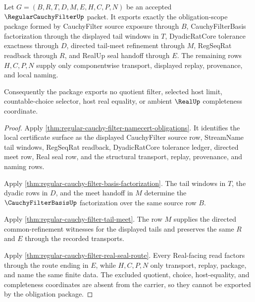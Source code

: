 \begin{theorem}
\label{thm:regular-cauchy-filter-obligation-scope-package}
Let $G=(B,R,T,D,M,E,H,C,P,N)$ be an accepted $\RegularCauchyFilterUp$ packet. It exports exactly the obligation-scope package formed by CauchyFilter source exposure through $B$, CauchyFilterBasis factorization through the displayed tail windows in $T$, DyadicRatCore tolerance exactness through $D$, directed tail-meet refinement through $M$, RegSeqRat readback through $R$, and RealUp seal handoff through $E$. The remaining rows $H,C,P,N$ supply only componentwise transport, displayed replay, provenance, and local naming.

Consequently the package exports no quotient filter, selected host limit, countable-choice selector, host real equality, or ambient $\RealUp$ completeness coordinate.
\end{theorem}
\begin{proof}
Apply \autoref{thm:regular-cauchy-filter-namecert-obligations}. It identifies the local certificate surface as the displayed CauchyFilter source row, StreamName tail windows, RegSeqRat readback, DyadicRatCore tolerance ledger, directed meet row, Real seal row, and the structural transport, replay, provenance, and naming rows.

Apply \autoref{thm:regular-cauchy-filter-basis-factorization}. The tail windows in $T$, the dyadic rows in $D$, and the meet handoff in $M$ determine the $\CauchyFilterBasisUp$ factorization over the same source row $B$.

Apply \autoref{thm:regular-cauchy-filter-tail-meet}. The row $M$ supplies the directed common-refinement witnesses for the displayed tails and preserves the same $R$ and $E$ through the recorded transports.

Apply \autoref{thm:regular-cauchy-filter-real-seal-route}. Every Real-facing read factors through the route ending in $E$, while $H,C,P,N$ only transport, replay, package, and name the same finite data. The excluded quotient, choice, host-equality, and completeness coordinates are absent from the carrier, so they cannot be exported by the obligation package.
\end{proof}

